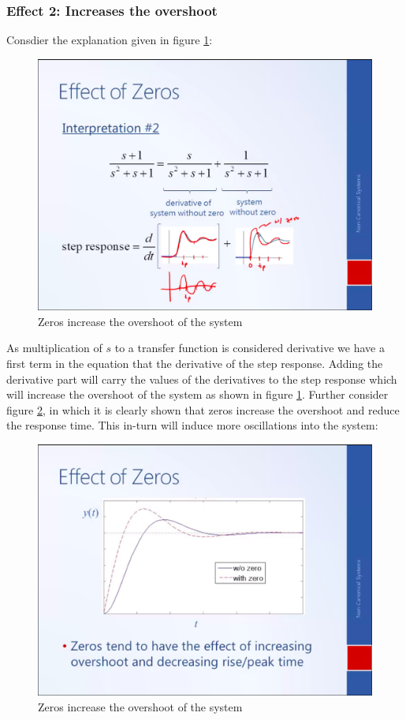 \subsubsection{Effect 2: Increases the overshoot}
Consdier the explanation given in figure \ref{Fig_EffectofZeros2}:
\clearpage
\begin{figure}[h!]
	\centering
	\includegraphics[width=\linewidth]{Bilder/Effect_of_Zeros_2}
	\caption{Zeros increase the overshoot of the system}
	\label{Fig_EffectofZeros2}
\end{figure}
As multiplication of $s$ to a transfer function is considered derivative we have a first term in the equation that the derivative of the step response. Adding the derivative part will carry the values of the derivatives to the step response which will increase the overshoot of the system as shown in figure \ref{Fig_EffectofZeros2}. Further consider figure \ref{Fig_EffectofZeros2_2}, in which it is clearly shown that zeros increase the overshoot and reduce the response time. This in-turn will induce more oscillations into the system:
\begin{figure}[h!]
	\centering
	\includegraphics[width=\linewidth]{Bilder/EffectOfZeros2_2}
	\caption{Zeros increase the overshoot of the system}
	\label{Fig_EffectofZeros2_2}
\end{figure}
\clearpage
